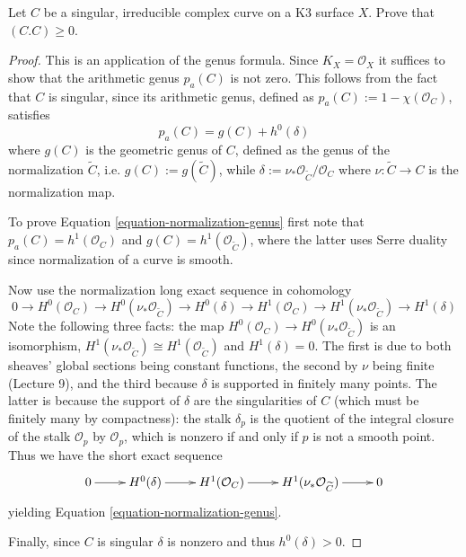 \begin{exercise}[2.7]
\label{exercise-singular-curve-on-k3}
Let $C$ be a singular, irreducible complex
curve on a K3 surface $X$. Prove that
$(C.C)\geq 0$.
\end{exercise}

\begin{proof}
This is an application of the genus
formula. Since
$K_X=\mathcal{O}_X$ it suffices to show that
the arithmetic genus
$p_a(C)$ is not zero. This follows from the
fact that $C$ is singular, since its
arithmetic genus, defined as 
$p_a(C):=1-\chi(\mathcal{O}_C)$,
satisfies
\begin{equation}
\label{equation-normalization-genus}
p_a(C)=g(C) + h^0(\delta)
\end{equation}
where $g(C)$ is the geometric genus of $C$,
defined as
the genus of the normalization $\tilde{C}$,
i.e. $g(C):=g(\tilde{C})$,
while $\delta:=\nu_*\mathcal{O}_{\tilde{C}}
/\mathcal{O}_C$
where $\nu:\tilde{C} \to C$ is the
normalization map.

To prove Equation
\ref{equation-normalization-genus}
first note that
$p_a(C)=h^1(\mathcal{O}_C)$
and $g(C) =
h^1(\mathcal{O}_{\widetilde{C}})$,
where the latter uses Serre duality since
normalization of a curve is smooth.

Now use the normalization
long exact sequence in cohomology
$$
0 \to
H^0(\mathcal{O}_C)\to
H^0(\nu_*\mathcal{O}_{\widetilde{C}})\to
H^0(\delta)\to
H^1(\mathcal{O}_C)\to
H^1(\nu_*\mathcal{O}_{\widetilde{C}})\to
H^1(\delta)
$$
Note the following three facts:
the map
$H^0(\mathcal{O}_C)
\to
H^0(\nu_*\mathcal{O}_{\widetilde{C}})$
is an isomorphism,
$H^1(\nu_*\mathcal{O}_{\widetilde{C}})
\cong H^1(\mathcal{O}_{\widetilde{C}})$
and
$H^1(\delta)=0$.
The first is due to both sheaves'
global sections being
constant functions,
the second by $\nu$ being finite
(Lecture 9),
and the third because $\delta$
is supported in finitely many points.
The latter is because the support of
$\delta$ are the singularities of $C$ 
(which must be finitely many
by compactness): the stalk
$\delta_p$ is the quotient of the
integral closure of the stalk
$\mathcal{O}_p$ by $\mathcal{O}_p$,
which is nonzero if and only if $p$
is not a smooth point.
Thus we have the short exact sequence
$$
\xymatrix{
0\ar[r]
&H^0(\delta)\ar[r]
&H^1(\mathcal{O}_C)\ar[r]
&H^1(\nu_*\mathcal{O}_{\widetilde{C}})\ar[r]
&0
}
$$
yielding
Equation \ref{equation-normalization-genus}.

Finally, since $C$ is singular
$\delta$ is nonzero and thus
$h^0(\delta)>0$.
\end{proof}

